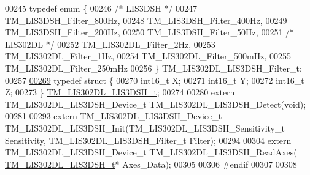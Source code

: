 \begin{DoxyCode}
00245 \textcolor{keyword}{typedef} \textcolor{keyword}{enum} \{
00246     \textcolor{comment}{/* LIS3DSH */}
00247     TM\_LIS3DSH\_Filter\_800Hz,
00248     TM\_LIS3DSH\_Filter\_400Hz,
00249     TM\_LIS3DSH\_Filter\_200Hz,
00250     TM\_LIS3DSH\_Filter\_50Hz,
00251     \textcolor{comment}{/* LIS302DL */}
00252     TM\_LIS302DL\_Filter\_2Hz,
00253     TM\_LIS302DL\_Filter\_1Hz,
00254     TM\_LIS302DL\_Filter\_500mHz,
00255     TM\_LIS302DL\_Filter\_250mHz
00256 \} TM\_LIS302DL\_LIS3DSH\_Filter\_t;
00257 
\hypertarget{tm__stm32f4__lis302dl__lis3dsh_8h_source_l00269}{}\hyperlink{struct_t_m___l_i_s302_d_l___l_i_s3_d_s_h__t}{00269} \textcolor{keyword}{typedef} \textcolor{keyword}{struct }\{
00270     int16\_t X;
00271     int16\_t Y;
00272     int16\_t Z;
00273 \} \hyperlink{struct_t_m___l_i_s302_d_l___l_i_s3_d_s_h__t}{TM\_LIS302DL\_LIS3DSH\_t};
00274 
00280 \textcolor{keyword}{extern} TM\_LIS302DL\_LIS3DSH\_Device\_t TM\_LIS302DL\_LIS3DSH\_Detect(\textcolor{keywordtype}{void});
00281 
00293 \textcolor{keyword}{extern} TM\_LIS302DL\_LIS3DSH\_Device\_t TM\_LIS302DL\_LIS3DSH\_Init(TM\_LIS302DL\_LIS3DSH\_Sensitivity\_t Sensitivity,
       TM\_LIS302DL\_LIS3DSH\_Filter\_t Filter);
00294 
00304 \textcolor{keyword}{extern} TM\_LIS302DL\_LIS3DSH\_Device\_t TM\_LIS302DL\_LIS3DSH\_ReadAxes(
      \hyperlink{struct_t_m___l_i_s302_d_l___l_i_s3_d_s_h__t}{TM\_LIS302DL\_LIS3DSH\_t}* Axes\_Data);
00305 
00306 \textcolor{preprocessor}{#endif}
00307 
00308 
\end{DoxyCode}
